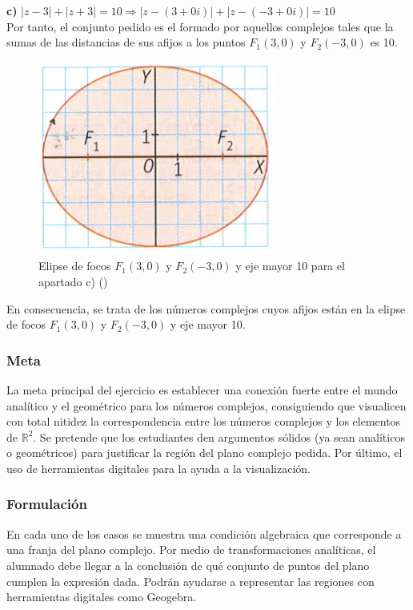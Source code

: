 \documentclass[../main.tex]{memoir}
\begin{document}
\textbf{c)} $|z-3|+ |z+3| = 10 \Rightarrow |z - (3+0i)| + |z - (-3+0i)| = 10$ \\
Por tanto, el conjunto pedido es el formado por aquellos complejos tales que la sumas de las distancias de sus afijos a los puntos $F_1(3,0)$ y $F_2(-3,0)$ es 10.

\begin{figure}[H]
	\centering
	\includegraphics[scale=0.4]{images/region3.png}
	\caption{Elipse de focos $F_1(3,0)$ y $F_2(-3,0)$ y eje mayor 10 para el apartado c) (\cite{sm1bach})}
	\label{region3}
\end{figure}

En consecuencia, se trata de los números complejos cuyos afijos están en la elipse de focos $F_1(3,0)$ y $F_2(-3,0)$ y eje mayor 10.


\subsubsection{Meta}
La meta principal del ejercicio es establecer una conexión fuerte entre el mundo analítico y el geométrico para los números complejos, consiguiendo que visualicen con total nitidez la correspondencia entre los números complejos y los elementos de $\mathbb{R}^2$. Se pretende que los estudiantes den argumentos sólidos (ya sean analíticos o geométricos) para justificar la región del plano complejo pedida. Por último, el uso de herramientas digitales para la ayuda a la visualización.

\subsubsection{Formulación}
En cada uno de los casos se muestra una condición algebraica que corresponde a una franja del plano complejo. Por medio de transformaciones analíticas, el alumnado debe llegar a la conclusión de qué conjunto de puntos del plano cumplen la expresión dada. Podrán ayudarse a representar las regiones con herramientas digitales como Geogebra.
\end{document}
